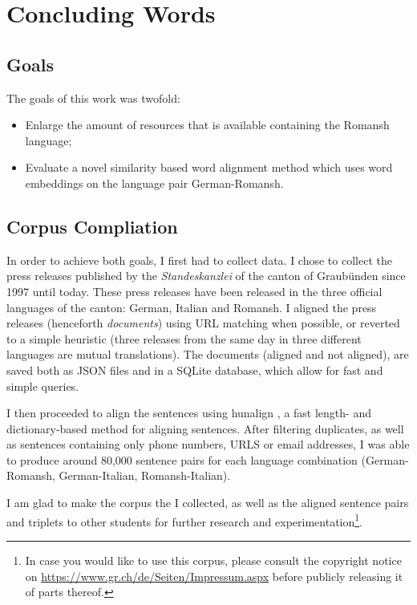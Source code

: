 \chapter{Concluding Words}\label{chap:summary}

\section{Goals}
The goals of this work was twofold: 
\begin{itemize}
	\item Enlarge the amount of resources that is available containing the Romansh language;
	\item Evaluate a novel similarity based word alignment method which uses word embeddings on the language pair German-Romansh.
\end{itemize}


\section{Corpus Compliation}
In order to achieve both goals, I first had to collect data. 
I chose to collect the press releases published by the \emph{Standeskanzlei} of the canton of Graubünden since 1997 until today. 
These press releases have been released in the three official languages of the canton: German, Italian and Romansh. 
I aligned the press releases (henceforth \emph{documents}) using URL matching when possible, or reverted to a simple heuristic (three releases from the same day in three different languages are mutual translations).
The documents (aligned and not aligned), are saved both as JSON files and in a SQLite database, which allow for fast and simple queries.

I then proceeded to align the sentences using hunalign \autocite{hunalign}, a fast length- and dictionary-based method for aligning sentences. 
After filtering duplicates, as well as sentences containing only phone numbers, URLS or email addresses, I was able to produce around 80,000 sentence pairs for each language combination (German-Romansh, German-Italian, Romansh-Italian).

I am glad to make the corpus the I collected, as well as the aligned sentence pairs and triplets to other students for further research and experimentation\footnote{In case you would like to use this corpus, please consult the copyright notice on \url{https://www.gr.ch/de/Seiten/Impressum.aspx} before publicly releasing it of parts thereof.}. 

